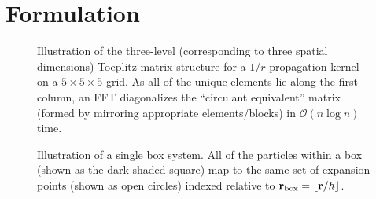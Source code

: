 \section{Formulation}

\begin{figure}
  \centering
  \caption{\label{fig:toeplitz}Illustration of the three-level (corresponding to three spatial dimensions) Toeplitz matrix structure for a $1/r$ propagation kernel on a $5 \times 5 \times 5$ grid.
  As all of the unique elements lie along the first column, an FFT diagonalizes the ``circulant equivalent'' matrix (formed by mirroring appropriate elements/blocks) in $\mathcal{O}(n \log n)$ time.}
\end{figure}

\begin{figure}
  \centering
  
  \caption{\label{fig:aim terminology} Illustration of a single box system.
    All of the particles within a box (shown as the dark shaded square) map to the same set of expansion points (shown as open circles) indexed relative to $\vb{r}_\text{box} = \lfloor\vb{r}/h\rfloor$.
  }
\end{figure}

